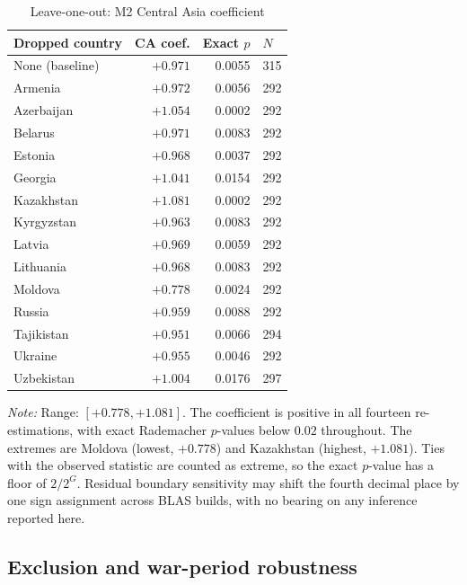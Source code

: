 \begin{table}[htbp]
\centering
\caption{Leave-one-out: M2 Central Asia coefficient}
\label{tab:loo-m2}
\small
\begin{tabular}{lrrl}
\toprule
Dropped country & CA coef. & Exact $p$ & $N$ \\
\midrule
None (baseline) & $+0.971$ & 0.0055 & 315 \\
\addlinespace
Armenia    & $+0.972$ & 0.0056 & 292 \\
Azerbaijan & $+1.054$ & 0.0002 & 292 \\
Belarus    & $+0.971$ & 0.0083 & 292 \\
Estonia    & $+0.968$ & 0.0037 & 292 \\
Georgia    & $+1.041$ & 0.0154 & 292 \\
Kazakhstan & $+1.081$ & 0.0002 & 292 \\
Kyrgyzstan & $+0.963$ & 0.0083 & 292 \\
Latvia     & $+0.969$ & 0.0059 & 292 \\
Lithuania  & $+0.968$ & 0.0083 & 292 \\
Moldova    & $+0.778$ & 0.0024 & 292 \\
Russia     & $+0.959$ & 0.0088 & 292 \\
Tajikistan & $+0.951$ & 0.0066 & 294 \\
Ukraine    & $+0.955$ & 0.0046 & 292 \\
Uzbekistan & $+1.004$ & 0.0176 & 297 \\
\bottomrule
\end{tabular}

\begin{minipage}{\textwidth}\footnotesize
\vspace{4pt}
\emph{Note:} Range: $[+0.778, +1.081]$. The coefficient is positive in all fourteen re-estimations, with exact Rademacher $p$-values below $0.02$ throughout. The extremes are Moldova (lowest, $+0.778$) and Kazakhstan (highest, $+1.081$). Ties with the observed statistic are counted as extreme, so the exact $p$-value has a floor of $2/2^G$. Residual boundary sensitivity may shift the fourth decimal place by one sign assignment across BLAS builds, with no bearing on any inference reported here.
\end{minipage}
\end{table}

\subsection{Exclusion and war-period robustness}
\label{app:exclusions}

